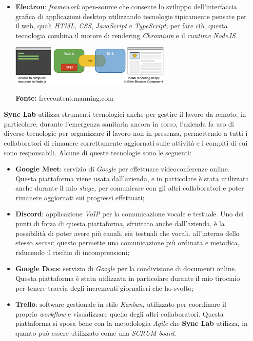 \begin{itemize}
  \item \textbf{Electron}: \textit{framework} open-source che consente lo sviluppo dell'interfaccia grafica di applicazioni desktop utilizzando tecnologie tipicamente pensate per il web, quali \textit{HTML}, \textit{CSS}, \textit{JavaScript} e \textit{TypeScript}; per fare ciò, questa tecnologia combina il motore di rendering \textit{Chromium} e il \textit{runtime} \textit{NodeJS}.

  \begin{minipage}{\linewidth}
    \centering
      \includegraphics[height=2cm]{immagini/electron}
    \caption*{\textbf{Fonte:} freecontent.manning.com}
  \end{minipage}
\end{itemize}

\textbf{Sync Lab} utilizza strumenti tecnologici anche per gestire il lavoro da remoto; in particolare, durante l'emergenza sanitaria ancora in corso, l'azienda fa uso di diverse tecnologie per organizzare il lavoro non in presenza, permettendo a tutti i collaboratori di rimanere correttamente aggiornati sulle attività e i compiti di cui sono responsabili. Alcune di queste tecnologie sono le seguenti:

\begin{itemize}
  \item \textbf{Google Meet}: servizio di \textit{Google} per effettuare videoconferenze online. Questa piattaforma viene usata dall'azienda, e in particolare è stata utilizzata anche durante il mio \textit{stage}, per comunicare con gli altri collaboratori e poter rimanere aggiornati sui progressi effettuati;

  \item \textbf{Discord}: applicazione \textit{VoIP} per la comunicazione vocale e testuale. Uno dei punti di forza di questa piattaforma, sfruttato anche dall'azienda, è la possibilità di poter avere più canali, sia testuali che vocali, all'interno dello stesso \textit{server}; questo permette una comunicazione più ordinata e metodica, riducendo il rischio di incomprensioni;

  \item \textbf{Google Docs}: servizio di \textit{Google} per la condivisione di documenti online. Questa piattaforma è stata utilizzata in particolare durante il mio tirocinio per tenere traccia degli incrementi giornalieri che ho svolto;

  \item \textbf{Trello}: software gestionale in stile \textit{Kanban}, utilizzato per coordinare il proprio \textit{workflow} e visualizzare quello degli altri collaboratori. Questa piattaforma si sposa bene con la metodologia \textit{Agile} che \textbf{Sync Lab} utilizza, in quanto può essere utilizzato come una \textit{SCRUM board}.
\end{itemize}

